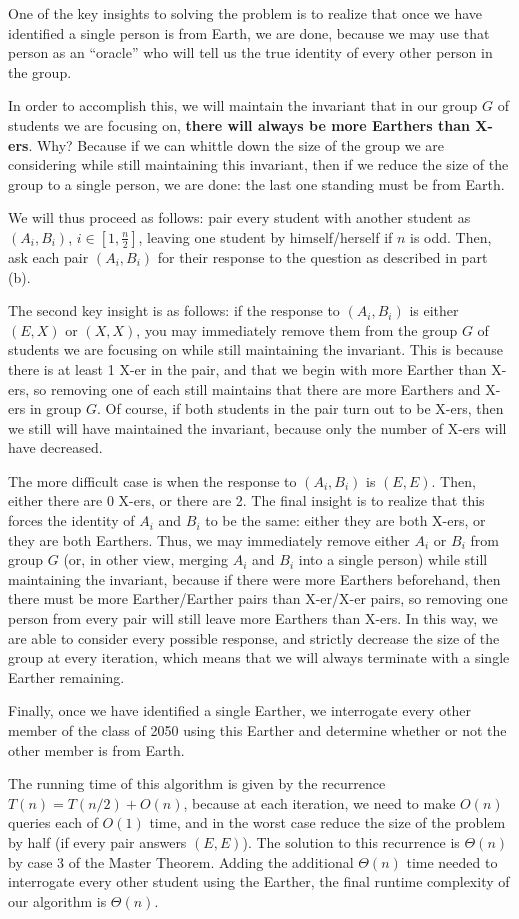 \documentclass{6046}
\begin{document}
One of the key insights to solving the problem is to realize that
once we have identified a single person is from Earth, we are done,
because we may use that person as an ``oracle'' who will tell us the true
identity of every other person in the group.

In order to accomplish this, we will maintain the invariant that in our group
$G$ of students we are focusing on, {\bf there will always be more
Earthers than X-ers}. Why? Because if we can whittle down the size of the
group we are considering while still maintaining this invariant, then if
we reduce the size of the group to a single person, we are done: the 
last one standing must be from Earth.

We will thus proceed as follows: pair every student with another student
as $(A_i, B_i)$, $i \in [1, \frac{n}{2}]$, leaving one student by 
himself/herself if $n$ is odd. Then, ask each pair $(A_i, B_i)$ for their 
response to the question as described in part (b).

The second key insight is as follows: if the response to $(A_i, B_i)$ is
either $(E, X)$ or $(X, X)$, you may immediately remove them from the
group $G$ of students we are focusing on while still maintaining
the invariant. This is because there is at least 1 X-er in the pair, and that
we begin with more Earther than X-ers, so removing one of each still maintains
that there are more Earthers and X-ers in group $G$. Of course, if both
students in the pair turn out to be X-ers, then we still will have maintained
the invariant, because only the number of X-ers will have decreased.

The more difficult case is when the response to $(A_i, B_i)$ is $(E, E)$.
Then, either there are 0 X-ers, or there are 2. The final insight is to realize
that this forces the identity of $A_i$ and $B_i$ to be the same: either they
are both X-ers, or they are both Earthers. Thus, we may immediately remove either 
$A_i$ or $B_i$ from group $G$ (or, in other view, merging $A_i$ and $B_i$
into a single person) while still maintaining the invariant, because if 
there were more Earthers beforehand, then there must be more Earther/Earther pairs 
than X-er/X-er pairs, so removing one person from every pair will still leave
more Earthers than X-ers. In this way, we are able to consider every possible
response, and strictly decrease the size of the group at every iteration,
which means that we will always terminate with a single Earther remaining.

Finally, once we have identified a single Earther, we interrogate every other
member of the class of 2050 using this Earther and determine whether
or not the other member is from Earth.

The running time of this algorithm is given by the recurrence
$T(n) = T(n / 2) + O(n)$, because at each iteration, we need to make $O(n)$
queries each of $O(1)$ time, and in the worst case reduce the size
of the problem by half (if every pair answers $(E, E)$). The solution to
this recurrence is $\Theta(n)$ by case 3 of the Master Theorem. Adding the
additional $\Theta(n)$ time needed to interrogate every other student using
the Earther, the final runtime complexity of our algorithm is $\Theta(n)$.
\end{document}
